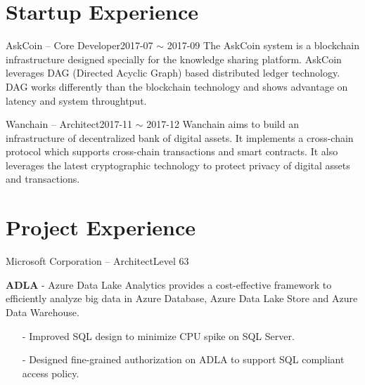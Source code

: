\documentclass[10pt,a4paper]{moderncv}
\begin{document}
\vspace*{0.4\baselineskip}

\section{Startup Experience}
\vspace*{0.2\baselineskip}
	{ AskCoin -- Core Developer}{2017-07 $\sim$ 2017-09}{}{}
	{The AskCoin system is a blockchain infrastructure designed specially for the knowledge sharing platform. AskCoin leverages DAG (Directed Acyclic Graph) based distributed ledger technology. DAG works differently than the blockchain technology and shows advantage on latency and system throughtput.}
\vspace{1ex}

	{Wanchain -- Architect}{2017-11 $\sim$ 2017-12}{}{}
	{Wanchain aims to build an infrastructure of decentralized bank of digital assets. It implements a cross-chain protocol which supports cross-chain transactions and smart contracts. It also leverages the latest cryptographic technology to protect privacy of digital assets and transactions.}
\vspace{1ex}

\vspace*{0.4\baselineskip}

\section{Project Experience}
\vspace{2ex}

	{ Microsoft Corporation -- Architect}{Level 63}{}{}{}

\vspace{1ex}
{
    \textbf{ADLA} - Azure Data Lake Analytics provides a cost-effective framework to efficiently analyze big data in Azure Database, Azure Data Lake Store and Azure Data Warehouse.
    \begin{itemize}
		\item[-] Improved SQL design to minimize CPU spike on SQL Server.
		\item[-] Designed fine-grained authorization on ADLA to support SQL compliant access policy.
	\end{itemize}
}
\vspace{2ex}
\end{document}
